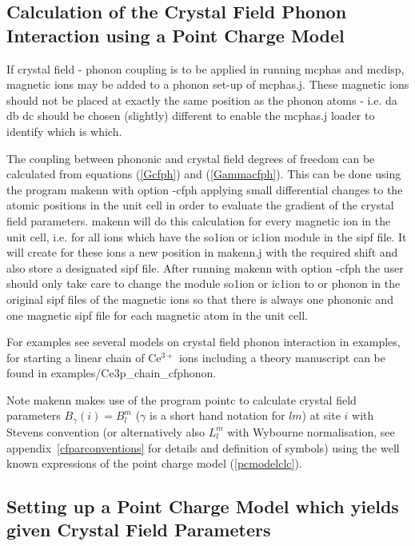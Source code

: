 \subsection{Calculation of the Crystal Field Phonon Interaction using a Point Charge Model}\label{determineBlmfromPC}

If crystal field - phonon coupling is to be applied in running {\prg mcphas} and {\prg mcdisp},
 magnetic ions may be added to a phonon set-up of {\prg mcphas.j}.
These magnetic ions should not be placed at exactly the same position as the phonon atoms - i.e. da db dc should be chosen
(slightly) different to enable the mcphas.j loader to identify which is which.

The coupling between phononic and crystal field degrees of freedom can be calculated from equations
(\ref{Gcfph}) and (\ref{Gammacfph}).
 This can be done
using the program  {\prg makenn} with option {\prg -cfph}  applying small differential changes to
the atomic positions in the unit cell in order to evaluate the gradient of the crystal field
parameters. {\prg makenn} will do this calculation for every magnetic ion in the unit cell,
i.e. for all ions which have the {\prg so1ion} or {\prg ic1ion} module in the {\prg sipf} file.
It will create for these ions a new position in makenn.j with the required
shift and also store a designated sipf file. After running {\prg makenn} with option {\prg -cfph} 
the user should only take care to change the module {\prg so1ion}  or {\prg ic1ion} to  or {\prg phonon}
in the original sipf files of the magnetic ions so that there is always one phononic and one magnetic
sipf file for each magnetic atom in the unit cell.

For examples see  several models on crystal field phonon interaction 
in {\prg examples}, for starting a linear chain of Ce$^{3+}$ ions including a
theory manuscript can be found in {\prg examples/Ce3p\_chain\_cfphonon}.

Note {\prg makenn}  makes use of the program {\prg pointc} to calculate 
crystal field parameters $B_{\gamma}(i)=B_l^m$ ($\gamma$ is a short hand
notation for $lm$) at site $i$  with Stevens convention (or alternatively also $L_l^m$ with
Wybourne normalisation, see appendix~\ref{cfparconventions} for details and definition of symbols) 
using the well known expressions of the point charge model (\ref{pcmodelclc}).



\subsection{Setting up a Point Charge Model which yields given Crystal Field Parameters}\label{determinePcmodel}

